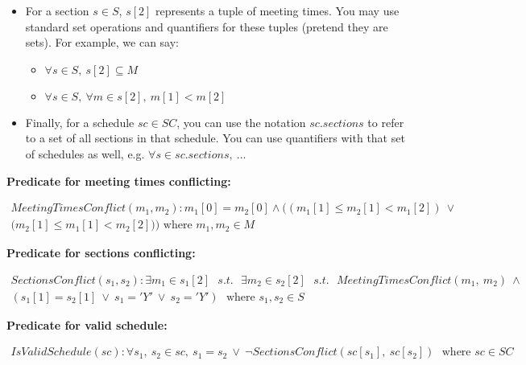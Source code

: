 \documentclass[fontsize=11pt]{article}
\begin{document}
\begin{enumerate}
\begin{enumerate}
\begin{itemize}
\item
For a section $s \in S$, $s[2]$ represents a tuple of meeting times.
You may use standard set operations and quantifiers for these tuples (pretend they are sets).
For example, we can say:

    \begin{itemize}
    \item $\forall s \in S,~ s[2] \subseteq M$
    \item $\forall s \in S,~ \forall m \in s[2],~ m[1] < m[2]$
    \end{itemize}

\item
Finally, for a schedule $sc \in SC$, you can use the notation $sc.sections$ to refer to a set of all sections in that schedule.
You can use quantifiers with that set of schedules as well, e.g.
$\forall s \in sc.sections,~ ...$
\end{itemize}

\textbf{Predicate for meeting times conflicting:}

\begin{align*}
MeetingTimesConflict(m_1, m_2) : \text{$m_1[0] = m_2[0] \wedge ((m_1[1] \leq m_2[1] < m_1[2]) ~ \vee$} \\ \text{($m_2[1] \leq m_1[1] < m_2[2]))$ where $m_1, m_2 \in M$}
\end{align*}

\smallskip

\textbf{Predicate for sections conflicting:}

\begin{align*}
SectionsConflict(s_1, s_2) : \text{$\exists m_1 \in s_1[2]$ } s.t. \text{ $\exists m_2 \in s_2[2]$ }  s.t.\text{ $MeetingTimesConflict(m_1, ~m_2) ~ \wedge$} \\ \text{$(s_1[1] = s_2[1] ~ \vee ~ s_1 = 'Y' ~ \vee ~ s_2 = 'Y')$ } \text{where $s_1, s_2 \in S$}
\end{align*}

\smallskip

\textbf{Predicate for valid schedule:}

\begin{align*}
IsValidSchedule(sc) : \text{$\forall s_1, ~ s_2 \in sc, ~ s_1 = s_2 ~ \vee ~ \lnot SectionsConflict(sc[s_1], ~sc[s_2])$ } \text{where $sc \in SC$}
\end{align*}



\end{enumerate}
\end{enumerate}
\end{document}
